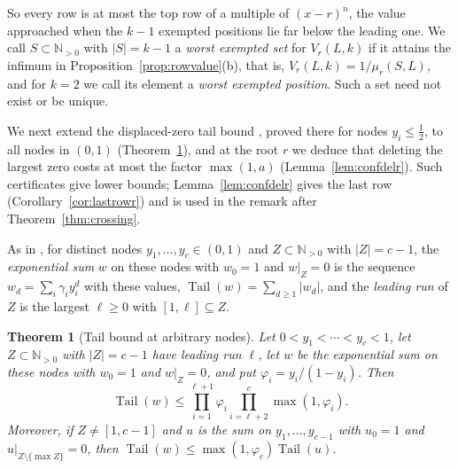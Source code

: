 \documentclass[11pt]{article}
\newtheorem{theorem}{Theorem}[section]
\newcommand{\N}{\mathbb N}
\DeclareMathOperator{\Tail}{Tail}
\begin{document}
So every row is at most the top row of a multiple of $(x-r)^n$, the value
approached when the $k-1$ exempted positions lie far below the leading one.
We call $S\subset\N_{>0}$ with $|S|=k-1$ a \emph{worst exempted set} for
$V_r(L,k)$ if it attains the infimum in Proposition~\ref{prop:rowvalue}(b), that is,
$V_r(L,k)=1/\mu_r(S,L)$, and for $k=2$ we call its element a \emph{worst
exempted position}.  Such a set need not exist or be unique.

We next extend the displaced-zero tail bound
\cite[Theorem~2.2]{coefficient-mass}, proved there for nodes
$y_i\le\frac12$, to all nodes in $(0,1)$ (Theorem~\ref{thm:tailgen}), and
at the root $r$ we deduce that deleting the largest zero costs at most the
factor $\max(1,a)$ (Lemma~\ref{lem:confdelr}).  Such certificates give
lower bounds; Lemma~\ref{lem:confdelr} gives the last row
(Corollary~\ref{cor:lastrowr}) and is used in the remark after
Theorem~\ref{thm:crossing}.

As in \cite[Section~2]{coefficient-mass}, for distinct nodes
$y_1,\ldots,y_c\in(0,1)$ and $Z\subset\N_{>0}$ with $|Z|=c-1$, the
\emph{exponential sum} $w$ on these nodes with $w_0=1$ and $w|_Z=0$ is the
sequence $w_d=\sum_i\gamma_iy_i^d$ with these values, $\Tail(w)=\sum_{d\ge1}|w_d|$,
and the \emph{leading run} of $Z$ is the largest $\ell\ge0$ with
$[1,\ell]\subseteq Z$.

\begin{theorem}[Tail bound at arbitrary nodes]\label{thm:tailgen}
Let $0<y_1<\cdots<y_c<1$, let $Z\subset\N_{>0}$ with $|Z|=c-1$ have leading
run $\ell$, let $w$ be the exponential sum on these nodes with $w_0=1$ and
$w|_Z=0$, and put $\varphi_i=y_i/(1-y_i)$.  Then
\[
  \Tail(w)\le\prod_{i=1}^{\ell+1}\varphi_i\prod_{i=\ell+2}^c\max(1,\varphi_i).
\]
Moreover, if $Z\ne[1,c-1]$ and $u$ is the sum on $y_1,\ldots,y_{c-1}$ with
$u_0=1$ and $u|_{Z\setminus\{\max Z\}}=0$, then
$\Tail(w)\le\max(1,\varphi_c)\Tail(u)$.
\end{theorem}
\end{document}
